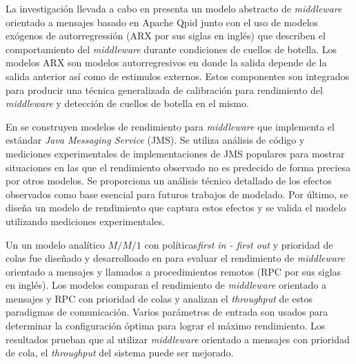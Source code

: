 \documentclass[11pt, twoside]{report}
\begin{document}
La investigación llevada a cabo en \cite{chew} presenta un modelo abstracto de \emph{middleware} orientado a mensajes basado en Apache Qpid junto con el uso de modelos exógenos de autorregressión (ARX por sus siglas en inglés) que describen el comportamiento del \emph{middleware} durante condiciones de cuellos de botella. Los modelos ARX son modelos autorregresivos en donde la salida depende de la salida anterior así como de estimulos externos. Estos componentes son integrados para producir una técnica generalizada de calibración para rendimiento del \emph{middleware} y detección de cuellos de botella en el mismo.

En \cite{martince-et-al} se construyen modelos de rendimiento para \emph{middleware} que implementa el estándar \emph{Java Messaging Service} (JMS). Se utiliza análisis de código y mediciones experimentales de implementaciones de JMS populares para mostrar situaciones en las que el rendimiento observado no es predecido de forma preciesa por otros modelos. Se proporciona un análisis técnico detallado de los efectos observados como base esencial para futuros trabajos de modelado. Por último, se diseña un modelo de rendimiento que captura estos efectos y se valida el modelo utilizando mediciones experimentales.

Un un modelo analítico $M/M/1$ con políticas\emph{first in - first out} y prioridad de colas fue diseñado y desarrolloado en \cite{alwakeel} para evaluar el rendimiento de \emph{middleware} orientado a mensajes y llamados a procedimientos remotos (RPC por sus siglas en inglés). Los modelos comparan el rendimiento de \emph{middleware} orientado a mensajes y RPC con prioridad de colas y analizan el \emph{throughput} de estos paradigmas de comunicación. Varios parámetros de entrada son usados para determinar la configuración óptima para lograr el máximo rendimiento. Los resultados prueban que al utilizar \emph{middleware} orientado a mensajes con prioridad de cola, el \emph{throughput} del sistema puede ser mejorado. 
\end{document}
